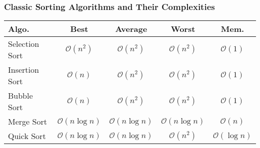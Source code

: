 \documentclass[compress,12pt,bookmark]{beamer}
\begin{document}
\begin{frame}
    \frametitle{Classic Sorting Algorithms and Their Complexities}
    \begin{table}
        \begin{tabular}{lcccc}
            \toprule
            Algo. & Best & Average & Worst & Mem. \\
            \midrule
            Selection Sort & $\mathcal{O}(n^2)$ & $\mathcal{O}(n^2)$ & $\mathcal{O}(n^2)$ & $\mathcal{O}(1)$ \\
            Insertion Sort & $\mathcal{O}(n)$ & $\mathcal{O}(n^2)$ & $\mathcal{O}(n^2)$ & $\mathcal{O}(1)$ \\
            Bubble Sort & $\mathcal{O}(n)$ & $\mathcal{O}(n^2)$ & $\mathcal{O}(n^2)$ & $\mathcal{O}(1)$ \\
            Merge Sort & $\mathcal{O}(n \log n)$ & $\mathcal{O}(n \log n)$ & $\mathcal{O}(n \log n)$ & $\mathcal{O}(n)$ \\
            Quick Sort & $\mathcal{O}(n \log n)$ & $\mathcal{O}(n \log n)$ & $\mathcal{O}(n^2)$ & $\mathcal{O}(\log n)$ \\
            \bottomrule
        \end{tabular}
    \end{table}
\end{frame}
\end{document}
